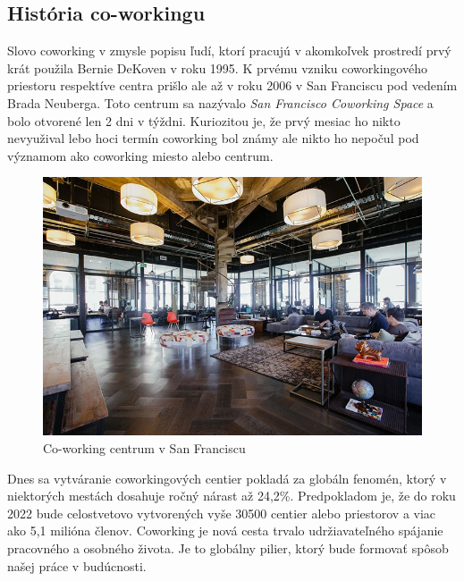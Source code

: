\subsection{História co-workingu}
\indent Slovo coworking v zmysle popisu ľudí, ktorí pracujú v akomkoľvek prostredí prvý krát použila Bernie DeKoven v roku 1995. K prvému vzniku coworkingového priestoru respektíve centra prišlo ale až v roku 2006 v San Franciscu pod vedením Brada Neuberga. Toto centrum sa nazývalo \textit{San Francisco Coworking Space} a bolo otvorené len 2 dni v týždni. Kuriozitou je, že prvý mesiac ho nikto nevyužival lebo hoci termín coworking bol známy ale nikto ho nepočul pod významom ako coworking miesto alebo centrum. 

\begin{figure}[H]
    \centering
    \includegraphics[scale=0.50]{img/coworking_space.jpg}
    \caption{Co-working centrum v San Franciscu}
    \label{fig:img-co-space}
\end{figure}

\indent Dnes sa vytváranie coworkingových centier pokladá za globáln fenomén, ktorý v niektorých mestách dosahuje ročný nárast až 24,2\%. Predpokladom je, že do roku 2022 bude celostvetovo vytvorených vyše 30500 centier alebo priestorov a viac ako 5,1 milióna členov. Coworking je nová cesta trvalo udržiavateľného spájanie pracovného a osobného života. Je to globálny pilier, ktorý bude formovať spôsob našej práce v budúcnosti. 


